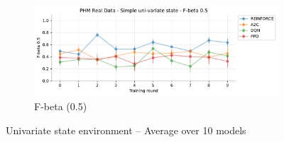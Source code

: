\documentclass[a4paper, 12pt]{article}
\begin{document}
\begin{figure}[!htbp]
	\begin{subfigure}{\textwidth}
		\centering
		\includegraphics[width=\linewidth]{Singevariable_F05.pdf}  
		\caption{F-beta (0.5)}
		\label{fig:tr-ss-f05}
	\end{subfigure}
	\caption{Univariate state environment -- Average over 10 models}
	\label{fig:tr-ss-env}
\end{figure}
\end{document}
